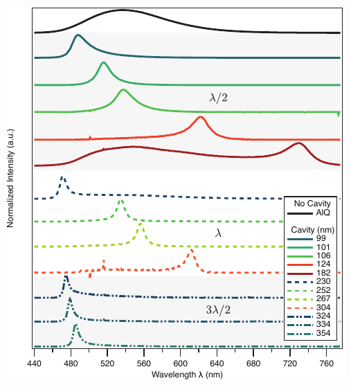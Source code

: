 \documentclass{beamer}
\begin{document}
\begin{frame}
\begin{columns}
\begin{column}{0.6\textwidth}
					\includegraphics[width=\textwidth]{images/n1_spectra.png}
                \end{column}
            \end{columns}
        \end{frame}
        
\end{document}
